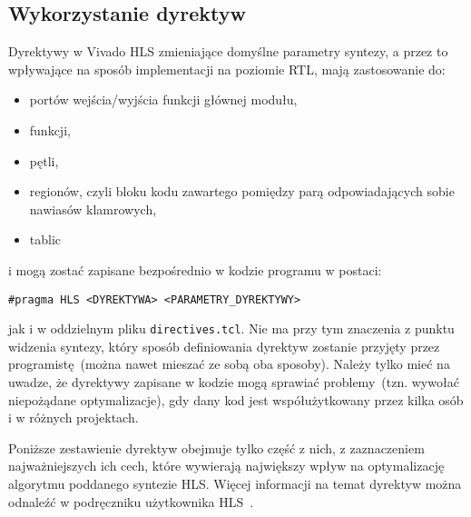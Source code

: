 \subsection{Wykorzystanie dyrektyw}
Dyrektywy w Vivado HLS zmieniające domyślne parametry syntezy, a przez to wpływające na sposób implementacji na poziomie RTL, mają zastosowanie do:
\begin{itemize}
\item portów wejścia/wyjścia funkcji głównej modułu,
\item funkcji,
\item pętli,
\item regionów, czyli bloku kodu zawartego pomiędzy parą odpowiadających sobie nawiasów klamrowych,
\item tablic
\end{itemize}
i mogą zostać zapisane bezpośrednio w kodzie programu w postaci:
\begin{lstlisting}
#pragma HLS <DYREKTYWA> <PARAMETRY_DYREKTYWY>
\end{lstlisting}
jak i w oddzielnym pliku \texttt{directives.tcl}. Nie ma przy tym znaczenia z punktu widzenia syntezy, który sposób definiowania dyrektyw zostanie przyjęty przez programistę~(można nawet mieszać ze sobą oba sposoby). Należy tylko mieć na uwadze, że dyrektywy zapisane w kodzie mogą sprawiać problemy~(tzn. wywołać niepożądane optymalizacje), gdy dany kod jest współużytkowany przez kilka osób i w różnych projektach.

Poniższe zestawienie dyrektyw obejmuje tylko część z nich, z zaznaczeniem najważniejszych ich cech, które wywierają największy wpływ na optymalizację algorytmu poddanego syntezie HLS. Więcej informacji na temat dyrektyw można odnaleźć w podręczniku użytkownika HLS~\cite{UG902}.

